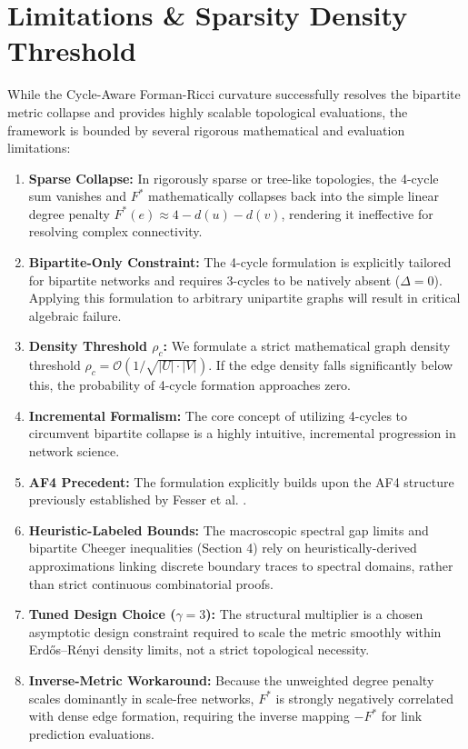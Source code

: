 \documentclass{siuro250211}
\begin{document}
\section{Limitations \& Sparsity Density Threshold}
While the Cycle-Aware Forman-Ricci curvature successfully resolves the bipartite metric collapse and provides highly scalable topological evaluations, the framework is bounded by several rigorous mathematical and evaluation limitations:
\begin{enumerate}
    \item \textbf{Sparse Collapse:} In rigorously sparse or tree-like topologies, the 4-cycle sum vanishes and $F^*$ mathematically collapses back into the simple linear degree penalty $F^*(e) \approx 4 - d(u) - d(v)$, rendering it ineffective for resolving complex connectivity.
    \item \textbf{Bipartite-Only Constraint:} The 4-cycle formulation is explicitly tailored for bipartite networks and requires 3-cycles to be natively absent ($\Delta=0$). Applying this formulation to arbitrary unipartite graphs will result in critical algebraic failure.
    \item \textbf{Density Threshold $\rho_c$:} We formulate a strict mathematical graph density threshold $\rho_c = \mathcal{O}(1 / \sqrt{|U| \cdot |V|})$. If the edge density falls significantly below this, the probability of 4-cycle formation approaches zero.
    \item \textbf{Incremental Formalism:} The core concept of utilizing 4-cycles to circumvent bipartite collapse is a highly intuitive, incremental progression in network science.
    \item \textbf{AF4 Precedent:} The formulation explicitly builds upon the AF4 structure previously established by Fesser et al. \cite{fesser2024augmentations}.
    \item \textbf{Heuristic-Labeled Bounds:} The macroscopic spectral gap limits and bipartite Cheeger inequalities (Section 4) rely on heuristically-derived approximations linking discrete boundary traces to spectral domains, rather than strict continuous combinatorial proofs.
    \item \textbf{Tuned Design Choice ($\gamma=3$):} The structural multiplier is a chosen asymptotic design constraint required to scale the metric smoothly within Erdős–Rényi density limits, not a strict topological necessity.
    \item \textbf{Inverse-Metric Workaround:} Because the unweighted degree penalty scales dominantly in scale-free networks, $F^*$ is strongly negatively correlated with dense edge formation, requiring the inverse mapping $-F^*$ for link prediction evaluations.

\end{enumerate}
\end{document}

